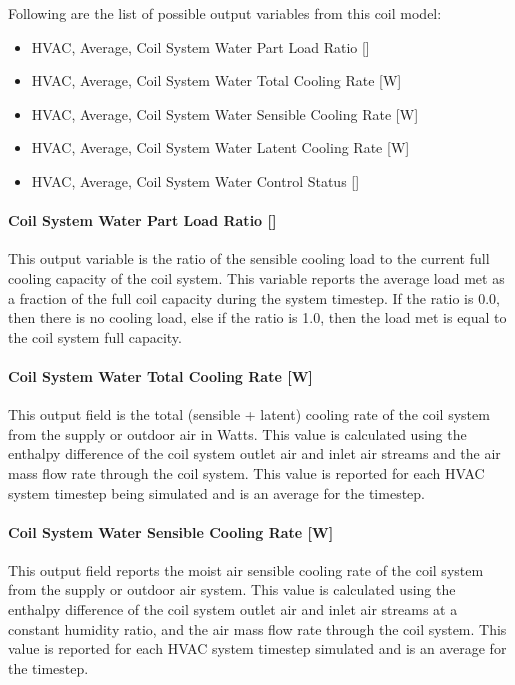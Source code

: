 Following are the list of possible output variables from this coil model:

\begin{itemize}
\item HVAC, Average, Coil System Water Part Load Ratio {[]}
\item HVAC, Average, Coil System Water Total Cooling Rate {[}W{]}
\item HVAC, Average, Coil System Water Sensible Cooling Rate {[}W{]}
\item HVAC, Average, Coil System Water Latent Cooling Rate {[}W{]}
\item HVAC, Average, Coil System Water Control Status {[]}
\end{itemize}


\paragraph{Coil System Water Part Load Ratio {[]}}\label{coil-system-water-part-load-ratio}

This output variable is the ratio of the sensible cooling load to the current full cooling capacity of the coil system. This variable reports the average load met as a fraction of the full coil capacity during the system timestep. If the ratio is 0.0, then there is no cooling load, else if the ratio is 1.0, then the load met is equal to the coil system full capacity.

\paragraph{Coil System Water Total Cooling Rate {[}W{]}}\label{coil-system-water-total-cooling-rate}

This output field is the total (sensible + latent) cooling rate of the coil system from the supply or outdoor air in Watts. This value is calculated using the enthalpy difference of the coil system outlet air and inlet air streams and the air mass flow rate through the coil system. This value is reported for each HVAC system timestep being simulated and is an average for the timestep.

\paragraph{Coil System Water Sensible Cooling Rate {[}W{]}}\label{coil-system-water-sensible-cooling-rate}

This output field reports the moist air sensible cooling rate of the coil system from the supply or outdoor air system. This value is calculated using the enthalpy difference of the coil system outlet air and inlet air streams at a constant humidity ratio, and the air mass flow rate through the coil system. This value is reported for each HVAC system timestep simulated and is an average for the timestep.

